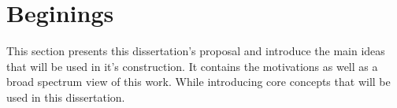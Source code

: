 \chapter{Beginings}

This section presents this dissertation's proposal and introduce the main ideas that will be used in it's construction. It contains the motivations as well as a broad spectrum view of this work. While introducing core concepts that will be used in this dissertation.




